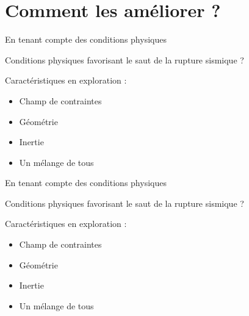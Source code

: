 \documentclass{beamer}
\begin{document}
\section{Comment les améliorer ?}


\begin{frame}
 {En tenant compte des conditions physiques}

Conditions physiques favorisant le saut de la rupture sismique ?

\begin{minipage}{0.5\linewidth}
  \hskip -3cm	 
\end{minipage}
\begin{minipage}{0.48\linewidth}
\vskip -0.7cm Caractéristiques en exploration :
\vskip 0.1cm
\begin{itemize}
 \item Champ de contraintes
 \item Géométrie
 \item Inertie
 \item Un mélange de tous
\end{itemize}

\end{minipage}

\end{frame}


\begin{frame}
 {En tenant compte des conditions physiques}

Conditions physiques favorisant le saut de la rupture sismique ?

\begin{minipage}{0.5\linewidth}
  \hskip -3cm	 %
\end{minipage}
\begin{minipage}{0.48\linewidth}
\vskip -0.7cm Caractéristiques en exploration :
\vskip 0.1cm
\begin{itemize}
 \item Champ de contraintes
 \item Géométrie
 \item Inertie
 \item Un mélange de tous
\end{itemize}

\end{minipage}

\end{frame}
\end{document}
